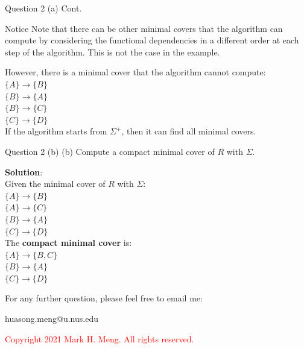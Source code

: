 \begin{frame}[fragile]{Question 2 (a) Cont.}
	\begin{alertblock}{Notice}
	Note that there can be other minimal covers that the algorithm can compute by considering the functional dependencies in a different order at each step of the algorithm. This is not the case in the example.
	\end{alertblock}\vspace{5pt}

	However, there is a minimal cover that the algorithm cannot compute:\\\vspace{5pt}
	$\{A\} \rightarrow \{B\}$\\
	$\{B\} \rightarrow \{A\}$\\
	$\{B\} \rightarrow \{C\}$\\
	$\{C\} \rightarrow \{D\}$\\\vspace{10pt}	
	If the algorithm starts from $\Sigma^{+}$, then it can find all minimal covers.
\end{frame}

\begin{frame}[fragile]{Question 2 (b)}
	(b) Compute a compact minimal cover of $R$ with $\Sigma$.\vspace{10pt}
	
	\textbf{Solution}: \\\vspace{5pt}
	Given the minimal cover of $R$ with $\Sigma$:\\\vspace{3pt}
	$\{A\} \rightarrow \{B\}$\\	
	$\{A\} \rightarrow \{C\}$\\	
	$\{B\} \rightarrow \{A\}$\\
	$\{C\} \rightarrow \{D\}$\\\vspace{5pt}
	The \textbf{compact minimal cover} is:\\\vspace{3pt}
	$\{A\} \rightarrow \{B, C\}$\\	
	$\{B\} \rightarrow \{A\}$\\	
	$\{C\} \rightarrow \{D\}$
\end{frame}


\begin{frame}{}
	\centering  
	For any further question, please feel free to email me:\vspace{10pt}
	
	huasong.meng@u.nus.edu\\\vspace{3pt}
	
	\begin{tcolorbox}
		\begin{center}
			\textcolor{red}{Copyright 2021 Mark H. Meng. All rights reserved.}
		\end{center}
	\end{tcolorbox}
\end{frame}